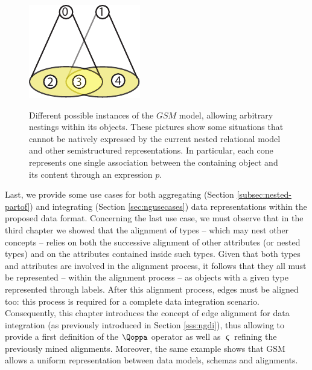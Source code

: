 \begin{figure}
	\begin{minipage}{.45\textwidth}
		\centering
		\includegraphics{fig/04model/03Overlapping}
		\label{fig:03overlapping}
	\end{minipage}
	\caption{Different possible instances of the $GSM$ model, allowing arbitrary nestings within its objects. These pictures show some situations that cannot be natively expressed by the current nested relational model and other semistructured representations. In particular, each cone represents one single association between the containing object and its content through an expression $p$.}
\end{figure}
Last, we provide some use cases for both aggregating (Section \ref{subsec:nested-partof}) and integrating (Section \ref{sec:ngusecases}) data representations within the proposed data format. Concerning the last use case, we must   observe that in the third chapter  we  showed that the alignment of types -- which may nest other concepts -- relies on both the successive alignment of other attributes (or nested types) and on the attributes contained inside such types. Given that both types and attributes are involved in the alignment process, it follows that they all must be represented -- within the alignment process -- as objects with a given type represented through labels. 
After this alignment process, edges must be aligned too: this process is required for a complete data integration scenario. Consequently, this chapter introduces the concept of edge alignment for data integration (as previously introduced in Section \vref{sss:ngdi}), thus allowing to provide a first definition of the $\qtransl$ operator as well as $\stigma$  refining the previously mined alignments. Moreover, the same example shows that GSM allows a uniform representation between data models, schemas and alignments.
